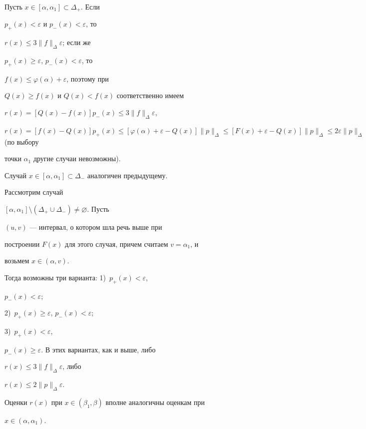 Пусть $x\in[\alpha,\alpha_1]\subset\Delta_+$. Если


$p_+(x)<\varepsilon$ и $p_-(x)<\varepsilon$, то


$r(x)\le 3\|f\|_\Delta\varepsilon$; если же


$p_+(x)\ge\varepsilon$, $p_-(x)<\varepsilon$, то


$f(x)\le\varphi(\alpha)+\varepsilon$, поэтому при


$Q(x)\ge f(x)$ и $Q(x)<f(x)$ соответственно имеем


$r(x)=[Q(x)-f(x)]p_-(x)\le 3\|f\|_\Delta\varepsilon$,


$r(x)=[f(x)-Q(x)]p_+(x)\le [\varphi(\alpha)+\varepsilon-Q(x)]


\|p\|_\Delta\le [F(x)+\varepsilon-Q(x)]\|p\|_\Delta\le


2\varepsilon\|p\|_\Delta$ (по выбору


точки $\alpha_1$ другие случаи невозможны).





Случай $x\in[\alpha,\alpha_1]\subset\Delta_-$ аналогичен предыдущему.





Рассмотрим случай


$[\alpha,\alpha_1]\setminus(\Delta_+\cup\Delta_-)\ne\varnothing$. Пусть


$(u,v)$ --- интервал, о котором шла речь выше при


построении $F(x)$ для этого случая, причем считаем $v=\alpha_1$, и


возьмем $x\in(\alpha,v)$.


Тогда возможны три варианта: 1)~$p_+(x)<\varepsilon$,


$p_-(x)<\varepsilon$;


2)~$p_+(x)\ge\varepsilon$, $p_-(x)<\varepsilon$;


3)~$p_+(x)<\varepsilon$,


$p_-(x)\ge\varepsilon$. В этих вариантах, как и выше, либо


$r(x)\le 3\|f\|_\Delta\varepsilon$, либо


$r(x)\le 2\|p\|_\Delta\varepsilon$.





Оценки $r(x)$ при $x\in(\beta_1,\beta)$ вполне аналогичны оценкам при


$x\in(\alpha,\alpha_1)$.





